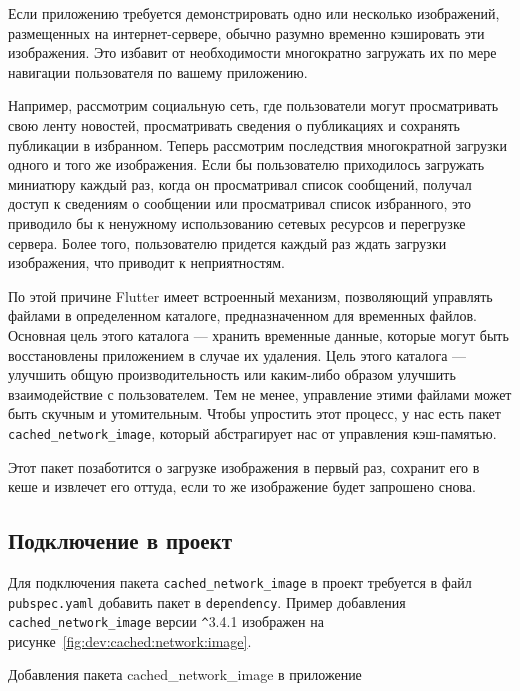 Если приложению требуется демонстрировать одно или несколько изображений,
размещенных на интернет-сервере,
обычно разумно временно кэшировать эти изображения.
Это избавит от необходимости многократно загружать
их по мере навигации пользователя по вашему приложению.\par
Например, рассмотрим социальную сеть,
где пользователи могут просматривать свою ленту новостей,
просматривать сведения о публикациях и сохранять публикации в избранном.
Теперь рассмотрим последствия многократной загрузки одного
и того же изображения.
Если бы пользователю приходилось загружать миниатюру каждый раз,
когда он просматривал список сообщений,
получал доступ к сведениям о сообщении или просматривал список избранного,
это приводило бы к ненужному использованию сетевых ресурсов
и перегрузке сервера.
Более того, пользователю придется каждый раз ждать загрузки изображения,
что приводит к неприятностям.\par
По этой причине Flutter имеет встроенный механизм,
позволяющий управлять файлами в определенном каталоге,
предназначенном для временных файлов.
Основная цель этого каталога --- хранить временные данные,
которые могут быть восстановлены приложением в случае их удаления.
Цель этого каталога --- улучшить общую производительность
или каким-либо образом улучшить взаимодействие с пользователем.
Тем не менее, управление этими файлами может быть скучным и утомительным.
Чтобы упростить этот процесс, у нас есть пакет \texttt{cached\_network\_image},
который абстрагирует нас от управления кэш-памятью.\par
Этот пакет позаботится о загрузке изображения в первый раз,
сохранит его в кеше и извлечет его оттуда,
если то же изображение будет запрошено снова.

\subsection{Подключение в проект}

Для подключения пакета \texttt{cached\_network\_image}
в проект требуется в файл \texttt{pubspec.yaml}
добавить пакет в \texttt{dependency}.
Пример добавления \texttt{cached\_network\_image} версии \verb|^|3.4.1
изображен на рисунке~\ref{fig:dev:cached:network:image}.

\begin{image}
	\caption{Добавления пакета cached\_network\_image в приложение}
	\label{fig:dev:cached:network:image}
\end{image}

